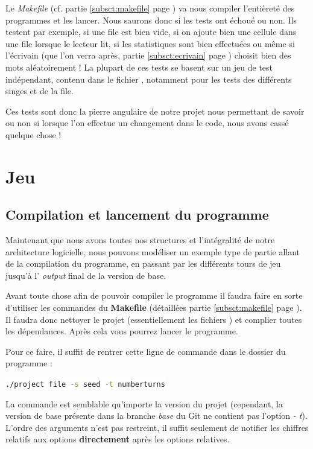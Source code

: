 \documentclass{article}
\newcommand{\inlinecode}[2]{\colorbox{white}{\lstinline[language=#1]$#2$}}
\begin{document}
Le \textit{Makefile} (cf. partie \ref{subsct:makefile} page \pageref{subsct:makefile}) va nous compiler l'entièreté des programmes et les lancer. Nous saurons donc si les tests ont échoué ou non. Ils testent par exemple, si une file est bien vide, si on ajoute bien une cellule dans une file lorsque le lecteur lit, si les statistiques sont bien effectuées ou même si l'écrivain (que l'on verra après, partie \ref{subsct:ecrivain} page \pageref{subsct:ecrivain}) choisit bien des mots aléatoirement ! La plupart de ces tests se basent sur un jeu de test indépendant, contenu dans le fichier , notamment pour les tests des différents singes et de la file.

Ces tests sont donc la pierre angulaire de notre projet nous permettant de savoir ou non si lorsque l'on effectue un changement dans le code, nous avons cassé quelque chose !


\section{Jeu}
\label{sct:jeu}


\subsection{Compilation et lancement du programme}
\label{subsct:compilation}

Maintenant que nous avons toutes nos structures et l'intégralité de notre architecture logicielle, nous pouvons modéliser un exemple type de partie allant de la compilation du programme, en passant par les différents tours de jeu jusqu'à l' \textit{output} final de la version de base.

Avant toute chose afin de pouvoir compiler le programme il faudra faire en sorte d'utiliser les commandes du \textbf{Makefile} (détaillées partie \ref{subsct:makefile} page \pageref{subsct:makefile}). Il faudra donc nettoyer le projet (essentiellement les fichiers ) et complier toutes les dépendances. Après cela vous pourrez lancer le programme.

Pour ce faire, il suffit de rentrer cette ligne de commande dans le dossier du programme :

\inlinecode{bash}{./project file -s seed -t numberturns}
\label{lst:bash_line}

La commande est semblable qu'importe la version du projet (cependant, la version de base présente dans la branche \textit{base} du Git ne contient pas l'option \textit{- t}). L'ordre des arguments n'est pas restreint, il suffit seulement de notifier les chiffres relatifs aux options \textbf{directement} après les options relatives.
\end{document}
